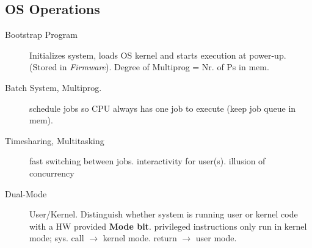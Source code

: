 \subsection*{OS Operations}
\begin{description}
    \item[Bootstrap Program] Initializes system, loads OS kernel and starts execution at power-up. (Stored in \textit{Firmware}). \hfill Degree of Multiprog = Nr. of Ps in mem.
  \item[Batch System, Multiprog.] schedule jobs so CPU always has one job to execute (keep job queue in mem).
  \item[Timesharing, Multitasking]  fast switching between jobs. interactivity for user(s). illusion of concurrency
  \item[Dual-Mode]User/Kernel. Distinguish whether system is running user or kernel code with a HW provided \textbf{Mode bit}. privileged instructions only run in kernel mode; sys. call $\rightarrow$ kernel mode. return $\rightarrow$ user mode. %
\end{description}
